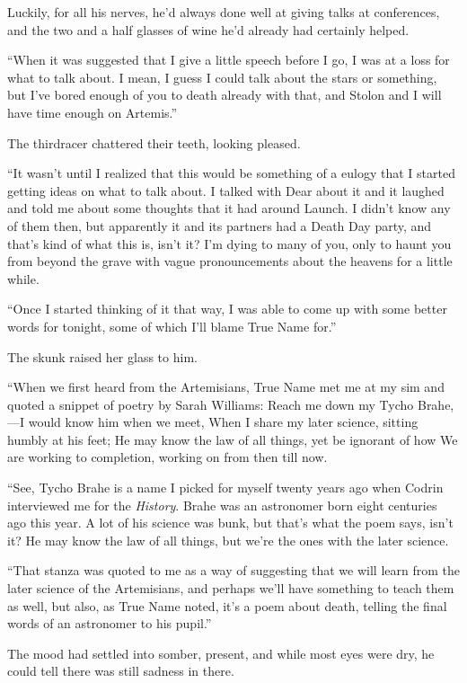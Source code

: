 Luckily, for all his nerves, he'd always done well at giving talks at conferences, and the two and a half glasses of wine he'd already had certainly helped.

``When it was suggested that I give a little speech before I go, I was at a loss for what to talk about. I mean, I guess I could talk about the stars or something, but I've bored enough of you to death already with that, and Stolon and I will have time enough on Artemis.''

The thirdracer chattered their teeth, looking pleased.

``It wasn't until I realized that this would be something of a eulogy that I started getting ideas on what to talk about. I talked with Dear about it and it laughed and told me about some thoughts that it had around Launch. I didn't know any of them then, but apparently it and its partners had a Death Day party, and that's kind of what this is, isn't it? I'm dying to many of you, only to haunt you from beyond the grave with vague pronouncements about the heavens for a little while.

``Once I started thinking of it that way, I was able to come up with some better words for tonight, some of which I'll blame True Name for.''

The skunk raised her glass to him.

``When we first heard from the Artemisians, True Name met me at my sim and quoted a snippet of poetry by Sarah Williams: Reach me down my Tycho Brahe,—I would know him when we meet, When I share my later science, sitting humbly at his feet; He may know the law of all things, yet be ignorant of how We are working to completion, working on from then till now.

``See, Tycho Brahe is a name I picked for myself twenty years ago when Codrin interviewed me for the \emph{History}. Brahe was an astronomer born eight centuries ago this year. A lot of his science was bunk, but that's what the poem says, isn't it? He may know the law of all things, but we're the ones with the later science.

``That stanza was quoted to me as a way of suggesting that we will learn from the later science of the Artemisians, and perhaps we'll have something to teach them as well, but also, as True Name noted, it's a poem about death, telling the final words of an astronomer to his pupil.''

The mood had settled into somber, present, and while most eyes were dry, he could tell there was still sadness in there.

